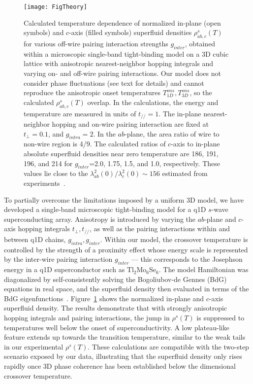 \documentclass[prb,twocolumn,showpacs,preprintnumbers,amsmath,amssymb,floatfix,groupedaddress,superscriptaddress,aps,10pt]{revtex4-1}
\newcommand{\Tl}{Tl$_2$Mo$_6$Se$_6$}
\begin{document}
\begin{figure}[tbp]
	\centering 
	\texttt{[image: FigTheory]}
	\caption{Calculated temperature dependence of normalized in-plane (open symbols) and $c$-axis (filled symbols) superfluid densities $\rho^s_{ab,c}(T)$ for various off-wire pairing interaction strengths $g_{inter}$, obtained within a microscopic single-band tight-binding model on a 3D cubic lattice with anisotropic nearest-neighbor hopping integrals and varying on- and off-wire pairing interactions. Our model does not consider phase fluctuations (see text for details) and cannot reproduce the anisotropic onset temperatures $T_{1D}^{ons},T_{3D}^{ons}$, so the calculated $\rho^s_{ab,c}(T)$ overlap.  In the calculations, the energy  and temperature are measured in units of $t_{/\!/}=1$.  The in-plane nearest-neighbor hopping and on-wire pairing interaction are fixed at $t_\perp=0.1$, and $g_{intra}=2$. In the $ab$-plane, the area ratio of wire to non-wire region is 4/9. The calculated ratios of $c$-axis to in-plane absolute superfluid densities near zero temperature are 186, 191, 196, and 214 for $g_{inter}$=2.0, 1.75, 1.5, and 1.0, respectively. These values lie close to the $\lambda_{ab}^{2}(0)/\lambda_{c}^{2}(0)\sim 156$ estimated from experiments~\cite{Petrovic2010}.}
	\label{FigTheory}
\end{figure}

To partially overcome the limitations imposed by a uniform 3D model, we have developed  a single-band microscopic tight-binding model for a q1D $s$-wave superconducting array. Anisotropy is introduced by varying the $ab$-plane and $c$-axis hopping integrals $t_\perp,t_{/\!/}$, as well as the pairing interactions within and between q1D chains, $g_{intra},g_{inter}$.  Within our model, the crossover temperature is controlled by the strength of a proximity effect whose energy scale is represented by the inter-wire pairing interaction $g_{inter}$ --- this corresponds to the Josephson energy in a q1D superconductor such as {\Tl}. The model Hamiltonian was diagonalized by self-consistently solving the Bogoliubov-de Gennes (BdG) equations in real space, and the superfluid density then evaluated in terms of the BdG eigenfunctions~\cite{JXZhu:2016}. Figure~\ref{FigTheory} shows the normalized in-plane and $c$-axis superfluid density. The results demonstrate that with strongly anisotropic hopping integrals and pairing interactions, the jump in $\rho^s(T)$ is suppressed to temperatures well below the onset of superconductivity.  A low plateau-like feature extends up towards the transition temperature, similar to the weak tails in our experimental $\rho^s(T)$.  These calculations are compatible with the two-step scenario exposed by our data, illustrating that the superfluid density only rises rapidly once 3D phase coherence has been established below the dimensional crossover temperature.  
\end{document}
